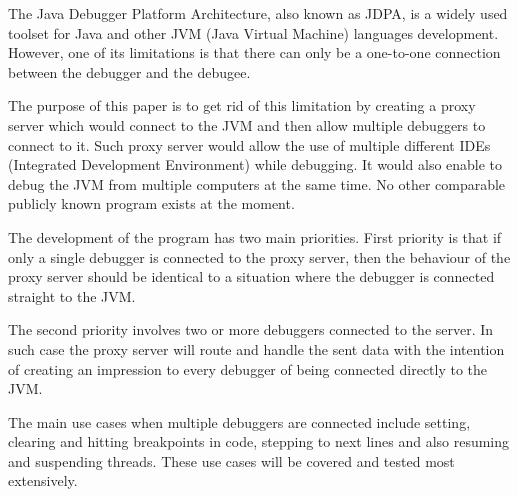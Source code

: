 \documentclass[..thesis.tex]{subfiles}
\begin{document}

The Java Debugger Platform Architecture, also known as JDPA, is a widely used toolset for Java and other JVM (Java Virtual Machine) languages development.
However, one of its limitations is that there can only be a one-to-one connection between the debugger and the debugee.


The purpose of this paper is to get rid of this limitation by creating a proxy server which would connect to the JVM and then allow multiple debuggers to connect to it. 
Such proxy server would allow the use of multiple different IDEs (Integrated Development Environment) while debugging. It would also enable to debug the JVM from multiple computers at the same time. 
No other comparable publicly known program exists at the moment.


The development of the program has two main priorities. 
First priority is that if only a single debugger is connected to the proxy server, then the behaviour of the proxy server should be identical to a situation where the debugger is connected straight to the JVM.

The second priority involves two or more debuggers connected to the server. In such case the proxy server will route and handle the sent data with the intention of creating an impression to every debugger of being connected directly to the JVM.

The main use cases when multiple debuggers are connected include setting, clearing and hitting breakpoints in code, stepping to next lines and also resuming and suspending threads.
These use cases will be covered and tested most extensively.
\end{document}
